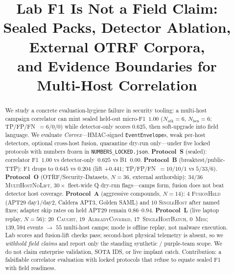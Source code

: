 \documentclass[conference,compsoc]{IEEEtran}
\begin{document}
\title{Lab F1 Is Not a Field Claim:\\
Sealed Packs, Detector Ablation, External OTRF Corpora,\\
and Evidence Boundaries for Multi-Host Correlation}

\author{
}

\maketitle

\begin{abstract}
We study a concrete evaluation-hygiene failure in security tooling: a
multi-host campaign correlator can mint sealed held-out micro-F1~$1.00$
($N_{\mathrm{atk}}{=}6$, $N_{\mathrm{ben}}{=}6$; TP/FP/FN~$=6/0/0$) while
detector-only scores $0.625$, then soft-upgrade into field language.
We evaluate \emph{Corvex}---HMAC-signed \texttt{EventEnvelope}s, weak
per-host detectors, optional cross-host fusion, quarantine dry-run
only---under five locked protocols with numbers frozen in
\texttt{NUMBERS\_LOCKED.json}.
\textbf{Protocol~S} (sealed): correlator F1~$1.00$ vs detector-only~$0.625$
vs B1~$0.00$.
\textbf{Protocol~B} (breaktest/public-TTP): F1 drops to $0.645$ vs
$0.204$ (lift $+0.441$; TP/FP/FN~$=10/10/1$ vs $5/33/6$).
\textbf{Protocol~O} (OTRF/Security-Datasets, $N{=}36$, external authorship):
$34/36$ \textsc{MultiHostNoLift}, $30\times$ fleet-wide Q dry-run flags---camps
form, fusion does not beat detector host coverage.
\textbf{Protocol~A} (aggressive compounds, $N{=}14$): $4$ \textsc{FusionHeld}
(APT29 day1/day2, Caldera APT3, Golden SAML) and $10$ \textsc{SingleHost}
after named fixes; adapter skip rates on held APT29 remain $0.86$--$0.94$.
\textbf{Protocol~L} (live laptop replay, $N{=}56$): $20$~\textsc{Caught},
$19$~\textsc{AlreadyCovered}, $17$~\textsc{SingleHostBatch},
$0$~\textsc{Miss}; $139{,}594$ events $\rightarrow$ $55$ multi-host camps;
mode is offline replay, not malware execution.
Lab scores and fusion-lift checks pass; second-host physical telemetry is
absent, so we \emph{withhold field claims} and report only the standing
synthetic / purple-team scope.
We do not claim enterprise validation, SOTA IDS, or live implant catch.
Contribution: a falsifiable correlator evaluation with locked protocols that
refuse to equate sealed F1 with field readiness.
\end{abstract}
\end{document}
